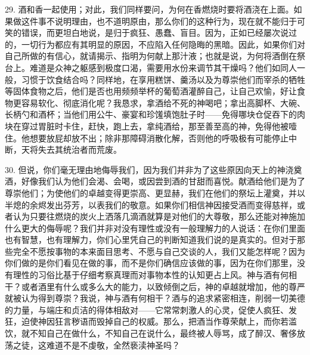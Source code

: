 29. 酒和香一起使用；对此，我们同样要问，为何在香燃烧时要将酒浇在上面。如果做这件事不说明理由，也不道明原由，那么你们的这种行为，现在就不能归于可笑的错误，而更坦白地说，是归于疯狂、愚蠢、盲目。因为，正如已经屡次说过的，一切行为都应有其明显的原因，不应陷入任何隐晦的黑暗。因此，如果你们对自己所做的有信心，就请揭示、指明为何献上那汁液；也就是说，为何将酒倒在祭台上。难道是众神之躯感到极度口渴，需要用水份来调节其干燥吗？他们如同人一般，习惯于饮食结合吗？同样地，在享用糕饼、羹汤以及为尊崇他们而宰杀的牺牲等固体食物之后，他们是否也用频频举杯的葡萄酒灌醉自己，让自己欢愉，好让食物更容易软化、彻底消化呢？我恳求，拿酒给不死的神喝吧；拿出高脚杯、大碗、长柄勺和酒杯；当他们用公牛、豪宴和珍馐填饱肚子时——免得哪块仓促吞下的肉块在穿过胃脏时卡住，赶快，跑上去，拿纯酒给，那至善至高的神，免得他被噎住。他想要放屁却放不出；除非那障碍消散化解，否则他的呼吸极有可能停止中断，天将失去其统治者而荒废。\par

30. 但说，你们毫无理由地侮辱我们，因为我们并非为了这些原因向天上的神浇奠酒，好像我们认为他们会渴、会喝，或因尝到酒的甘甜而喜悦。献酒给他们是为了尊崇他们；为使他们的卓越变得更崇高、更显赫，我们在他们的祭坛上灌奠，并以半熄的余烬发出芬芳，以表我们的敬意。如果你们相信神因接受酒而变得慈祥，或者认为只要往燃烧的炭火上洒落几滴酒就算是对他们的大尊敬，那么还能对神施加什么更大的侮辱呢？我们并非对没有理性或没有一般理解力的人说话：在你们里面也有智慧，也有理解力，你们心里凭自己的判断知道我们说的是真实的。但对于那些完全不愿按事物的本来面目思考、不愿与自己交谈的人，我们又能怎样呢？因为你们做的是你们看见在做的事，而不是你们确信应该做的事，因为在你们那里，没有理性的习俗比基于仔细考察真理而对事物本性的认知更占上风。神与酒有何相干？或者酒里有什么或多么大的能力，以致倾倒之后，神的卓越就增加，他的尊严就被认为得到尊崇？我说，神与酒有何相干？酒与的追求紧密相连，削弱一切美德的力量，与端庄和贞洁的得体相敌对——它常常刺激人的心灵，促使人疯狂、发狂，迫使神因狂言秽语而毁掉自己的权威。那么，把酒当作尊荣献上，而你若滥饮，就不知自己在做什么，不知自己在说什么，最终被人辱骂，成了醉汉、奢侈放荡之徒，这难道不是不虔敬，全然亵渎神圣吗？\par

